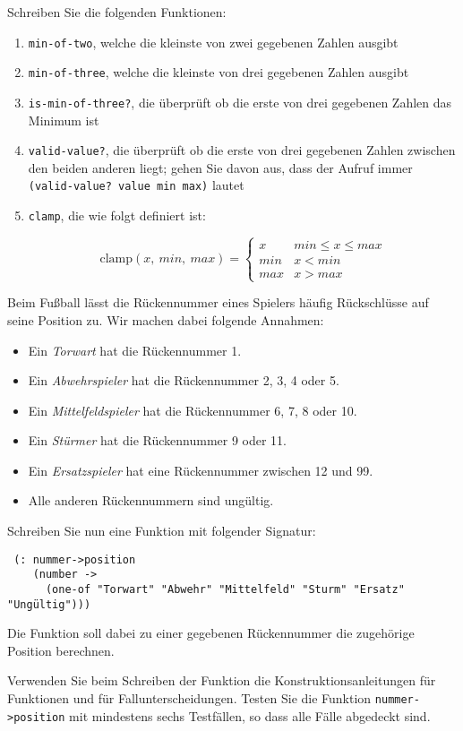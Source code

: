 \begin{aufgabe}
  Schreiben Sie die folgenden Funktionen:
  \begin{enumerate}
  \item \texttt{min-of-two}, welche die kleinste von zwei
    gegebenen Zahlen ausgibt
  \item \texttt{min-of-three}, welche die kleinste von drei
    gegebenen Zahlen ausgibt
  \item \texttt{is-min-of-three?}, die überprüft ob die erste
    von drei gegebenen Zahlen das Minimum ist
  \item \texttt{valid-value?}, die überprüft ob die erste von
    drei gegebenen Zahlen zwischen den beiden anderen liegt; gehen Sie
    davon aus, dass der Aufruf immer \texttt{(valid-value? value min max)}
    lautet 
  \item \texttt{clamp}, die wie folgt definiert ist:
    
    \[\text{clamp}(x,\ min,\ max)=
    \begin{cases} 
      x & min \leq x \leq max\\ 
      min & x < min \\ 
      max & x > max 
    \end{cases}
    \]
    
  \end{enumerate}
\end{aufgabe}

\begin{aufgabe}
  Beim Fußball lässt die Rückennummer eines Spielers
  häufig Rückschlüsse auf seine Position zu. Wir machen dabei folgende
  Annahmen:
  \begin{itemize}
  \item Ein \emph{Torwart} hat die Rückennummer 1.
  \item Ein \emph{Abwehrspieler} hat die Rückennummer 2, 3, 4 oder 5.
  \item Ein \emph{Mittelfeldspieler} hat die Rückennummer 6, 7, 8 oder 10.
  \item Ein \emph{Stürmer} hat die Rückennummer 9 oder 11.
  \item Ein \emph{Ersatzspieler} hat eine Rückennummer zwischen 12 und 99.
  \item Alle anderen Rückennummern sind ungültig.
  \end{itemize}
 
  Schreiben Sie nun eine Funktion mit folgender Signatur:
  
  {\small
\begin{verbatim}
 (: nummer->position
    (number ->
      (one-of "Torwart" "Abwehr" "Mittelfeld" "Sturm" "Ersatz" "Ungültig")))
\end{verbatim}
  }

  Die Funktion soll dabei zu einer gegebenen Rückennummer die
  zugehörige Position berechnen.

  Verwenden Sie beim Schreiben der Funktion die
  Konstruktionsanleitungen für Funktionen und für
  Fallunterscheidungen.  Testen Sie die Funktion
  \texttt{nummer->position} mit mindestens sechs Testfällen, so dass
  alle Fälle abgedeckt sind.
\end{aufgabe}


